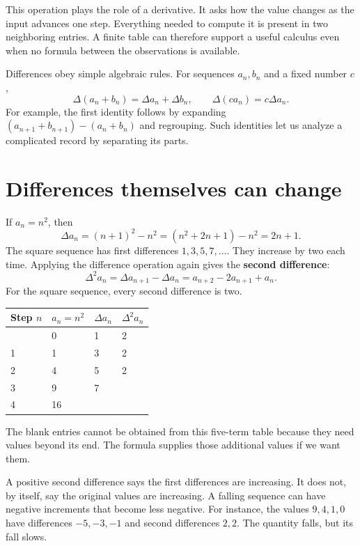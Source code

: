 \documentclass[11pt,oneside,openany]{book}
\theoremstyle{definition}
\theoremstyle{remark}
\numberwithin{equation}{chapter}
\begin{document}
This operation plays the role of a derivative. It asks how the value changes as the input advances one step. Everything needed to compute it is present in two neighboring entries. A finite table can therefore support a useful calculus even when no formula between the observations is available.

Differences obey simple algebraic rules. For sequences \(a_n,b_n\) and a fixed number \(c\), \[\Delta(a_n+b_n)=\Delta a_n+\Delta b_n,\qquad
\Delta(ca_n)=c\Delta a_n.\] For example, the first identity follows by expanding \((a_{n+1}+b_{n+1})-(a_n+b_n)\) and regrouping. Such identities let us analyze a complicated record by separating its parts.

\section{Differences themselves can change}\label{ch01-differences-themselves-can-change}

If \(a_n=n^2\), then \[\Delta a_n=(n+1)^2-n^2=(n^2+2n+1)-n^2=2n+1.\] The square sequence has first differences \(1,3,5,7,\ldots\). They increase by two each time. Applying the difference operation again gives the \textbf{second difference}: \[\Delta^2a_n=\Delta a_{n+1}-\Delta a_n
=a_{n+2}-2a_{n+1}+a_n.\] For the square sequence, every second difference is two.

\begin{longtable}[]{@{}llll@{}}
\toprule\noalign{}
Step \(n\) & \(a_n=n^2\) & \(\Delta a_n\) & \(\Delta^2a_n\) \\
\midrule\noalign{}
\endhead
\bottomrule\noalign{}
\endlastfoot
0 & 0 & 1 & 2 \\
1 & 1 & 3 & 2 \\
2 & 4 & 5 & 2 \\
3 & 9 & 7 & \\
4 & 16 & & \\
\end{longtable}

The blank entries cannot be obtained from this five-term table because they need values beyond its end. The formula supplies those additional values if we want them.

A positive second difference says the first differences are increasing. It does not, by itself, say the original values are increasing. A falling sequence can have negative increments that become less negative. For instance, the values \(9,4,1,0\) have differences \(-5,-3,-1\) and second differences \(2,2\). The quantity falls, but its fall slows.
\end{document}
